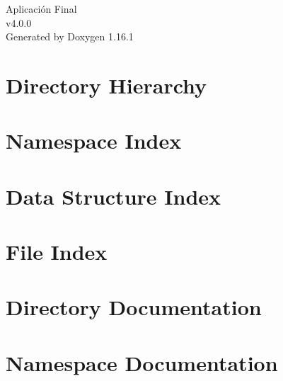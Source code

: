 \documentclass[twoside]{book}
\newcommand{\+}{\discretionary{\mbox{\scriptsize$\hookleftarrow$}}{}{}}
\newcommand{\clearemptydoublepage}{%
    \newpage{\pagestyle{empty}\cleardoublepage}%
  }
\begin{document}
  \raggedbottom
    \hypersetup{pageanchor=false,
                bookmarksnumbered=true,
                pdfencoding=unicode
               }
  \begin{titlepage}
  \vspace*{7cm}
  \begin{center}%
  {\Large Aplicación Final}\\
  [1ex]\large v4.\+0.\+0 \\
  \vspace*{1cm}
  {\large Generated by Doxygen 1.16.1}\\
  \end{center}
  \end{titlepage}
  \clearemptydoublepage
  \tableofcontents
  \clearemptydoublepage
  \hypersetup{pageanchor=true}
\chapter{Directory Hierarchy}

\chapter{Namespace Index}

\chapter{Data Structure Index}

\chapter{File Index}

\chapter{Directory Documentation}









\chapter{Namespace Documentation}







\end{document}
